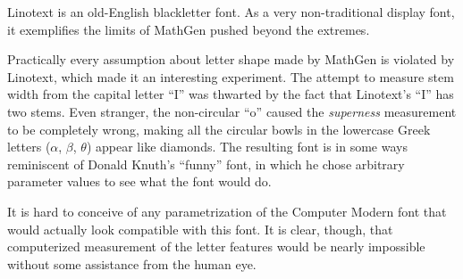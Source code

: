 
Linotext is an old-English blackletter font. As a very non-traditional display
font, it exemplifies the limits of MathGen pushed beyond the extremes.

Practically every assumption about letter shape made by MathGen is violated by
Linotext, which made it an interesting experiment. The attempt to measure stem
width from the capital letter ``I'' was thwarted by the fact that Linotext's
``I'' has two stems. Even stranger, the non-circular ``o'' caused the
\emph{superness} measurement to be completely wrong, making all the circular
bowls in the lowercase Greek letters ($\alpha$, $\beta$, $\theta$) appear like
diamonds. The resulting font is in some ways reminiscent of Donald Knuth's
``funny'' font, in which he chose arbitrary parameter values to see what the
font would do.

It is hard to conceive of any parametrization of the Computer Modern font that
would actually look compatible with this font. It is clear, though, that
computerized measurement of the letter features would be nearly impossible
without some assistance from the human eye.

